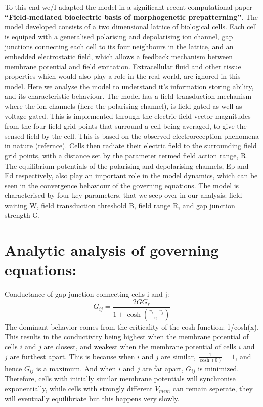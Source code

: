 \documentclass{article}
\begin{document}
\begin{flushleft}
To this end we/I adapted the model in a significant recent computational paper \textbf{“Field-mediated bioelectric basis of morphogenetic prepatterning”}.
The model developed consists of a two dimensional lattice of biological cells. Each cell is equiped with a generalised polarising and depolarising ion channel, gap junctions connecting each cell to its four neighbours in the lattice, and an embedded electrostatic field, which allows a feedback mechanism between membrane potential and field excitation. Extracellular fluid and other tissue properties which would also play a role in the real world, are ignored in this model.
Here we analyse the model to understand it's information storing ability, and its characteristic behaviour.
The model has a field transduction mechanism where the ion channels (here the polarising channel), is field gated as well as voltage gated. This is implemented through the electric field vector magnitudes from the four field grid points that surround a cell being averaged, to give the sensed field by the cell. This is based on the observed electroreception phenomena in nature (refernce). Cells then radiate their electric field to the surrounding field grid points, with a distance set by the parameter termed field action range, R. 
The equilibrium potentials of the polarising and depolarising channels, Ep and Ed respectively, also play an important role in the model dynamics, which can be seen in the convergence behaviour of the governing equations. 
The model is characterised by four key parameters, that we seep over in our analysis: field waiting W, field transduction threshold B, field range R, and gap junction strength G.

\hfill\break 
\hfill\break
\section*{Analytic analysis of governing equations:} 

Conductance of gap junction connecting cells i and j: \[ G_{ij} = \frac{2GG_r}{1 + \cosh\left(\frac{v_i - v_j}{v_0}\right)} \]
The dominant behavior comes from the criticality of the cosh function: 1/cosh(x). This results in the conductivity being highest when the membrane potential of cells $i$ and $j$ are closest, and weakest when the membrane potential of cells $i$ and $j$ are furthest apart. This is because when $i$ and $j$ are similar, $\frac{1}{\cosh(0)} = 1$, and hence $G_{ij}$ is a maximum. And when $i$ and $j$ are far apart, $G_{ij}$ is minimized. Therefore, cells with initially similar membrane potentials will synchronise exponentially, while cells with strongly different $V_{mem}$ can remain seperate, they will eventually equilibriate but this happens very slowly.
\hfill\break
\hfill\break


\end{flushleft}
\end{document}
